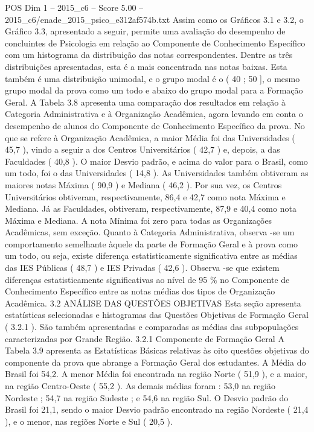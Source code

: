 \begin{textsample}{POS Dim 1 – 2015\_c6 – Score 5.00 – 2015\_c6/enade\_2015\_psico\_e312af574b.txt}
Assim como os Gráficos 3.1 e 3.2, o Gráfico 3.3, apresentado a seguir, permite uma avaliação do desempenho de concluintes de Psicologia em relação ao Componente de Conhecimento Específico com um histograma da distribuição das notas correspondentes.
Dentre as três distribuições apresentadas, esta é a mais concentrada nas notas baixas.
Esta também é uma distribuição unimodal, e o grupo modal é o ( 40 ; 50 ], o mesmo grupo modal da prova como um todo e abaixo do grupo modal para a Formação Geral.
A Tabela 3.8 apresenta uma comparação dos resultados em relação à Categoria Administrativa e à Organização Acadêmica, agora levando em conta o desempenho de alunos do Componente de Conhecimento Específico da prova.
No que se refere à Organização Acadêmica, a maior Média foi das Universidades ( 45,7 ), vindo a seguir a dos Centros Universitários ( 42,7 ) e, depois, a das Faculdades ( 40,8 ).
O maior Desvio padrão, e acima do valor para o Brasil, como um todo, foi o das Universidades ( 14,8 ).
As Universidades também obtiveram as maiores notas Máxima ( 90,9 ) e Mediana ( 46,2 ).
Por sua vez, os Centros Universitários obtiveram, respectivamente, 86,4 e 42,7 como nota Máxima e Mediana.
Já as Faculdades, obtiveram, respectivamente, 87,9 e 40,4 como nota Máxima e Mediana.
A nota Mínima foi zero para todas as Organizações Acadêmicas, sem exceção.
Quanto à Categoria Administrativa, observa -se um comportamento semelhante àquele da parte de Formação Geral e à prova como um todo, ou seja, existe diferença estatisticamente significativa entre as médias das IES Públicas ( 48,7 ) e IES Privadas ( 42,6 ).
Observa -se que existem diferenças estatisticamente significativas ao nível de 95 \% no Componente de Conhecimento Específico entre as notas médias dos tipos de Organização Acadêmica. 3.2 ANÁLISE DAS QUESTÕES OBJETIVAS Esta seção apresenta estatísticas selecionadas e histogramas das Questões Objetivas de Formação Geral ( 3.2.1 ).
São também apresentadas e comparadas as médias das subpopulações caracterizadas por Grande Região. 3.2.1 Componente de Formação Geral A Tabela 3.9 apresenta as Estatísticas Básicas relativas às oito questões objetivas do componente da prova que abrange a Formação Geral dos estudantes.
A Média do Brasil foi 54,2.
A menor Média foi encontrada na região Norte ( 51,9 ), e a maior, na região Centro-Oeste ( 55,2 ).
As demais médias foram : 53,0 na região Nordeste ; 54,7 na região Sudeste ; e 54,6 na região Sul.
O Desvio padrão do Brasil foi 21,1, sendo o maior Desvio padrão encontrado na região Nordeste ( 21,4 ), e o menor, nas regiões Norte e Sul ( 20,5 ).

\end{textsample}
